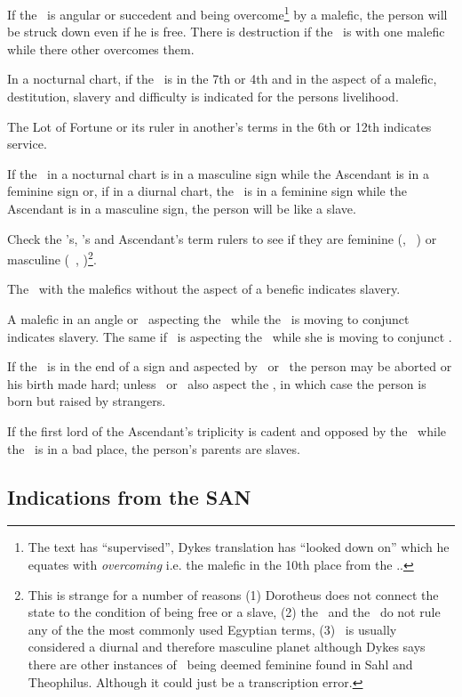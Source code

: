 If the \Moon\, is angular or succedent and being overcome\footnote{The text has ``supervised'', Dykes translation has ``looked down on'' which he equates with \textsl{overcoming} i.e. the malefic in the 10th place from the \Moon..} by a malefic, the person will be struck down even if he is free. There is destruction if the \Moon\, is with one malefic while there other overcomes them.

In a nocturnal chart, if the \Moon\, is in the 7th or 4th and in the aspect of a malefic, destitution, slavery and difficulty is indicated for the persons livelihood.

The Lot of Fortune or its ruler in another's terms in the 6th or 12th  indicates service.

If the \Moon\, in a nocturnal chart is in a masculine sign while the Ascendant is in a feminine sign or, if in a diurnal chart, the \Sun\, is in a feminine sign while the Ascendant is in a masculine sign, the person will be like a slave.

Check the \Moon's, \Sun's and Ascendant's term rulers to see if they are feminine (\Saturn, \Venus\, \Moon) or masculine (\Sun\, \Jupiter, \Mars)\footnote{This is strange for a number of reasons (1) Dorotheus does not connect the state to the condition of being free or a slave, (2) the \Moon\, and the \Sun\, do not rule any of the the most commonly used Egyptian terms, (3) \Saturn\, is usually considered a diurnal and therefore masculine planet although Dykes says there are other instances of \Saturn\, being deemed feminine found in Sahl and Theophilus. Although it could just be a transcription error.}.

The \Moon\, with the malefics without the aspect of a benefic indicates slavery.

A malefic in an angle or \Mars\, aspecting the \Moon\,  while the \Moon\, is moving to conjunct \Saturn\, indicates slavery. The same if \Saturn\, is aspecting the \Moon\, while she is moving to conjunct \Mars.

If the \Moon\, is in the end of a sign and aspected by \Saturn\, or \Mars\, the person may be aborted or his birth made hard; unless \Jupiter\, or \Venus\, also aspect the \Moon, in which case the person is born but raised by strangers.

If the first lord of the Ascendant's triplicity is cadent and opposed by the \Moon\, while the \Sun\, is in a bad place, the person's parents are slaves.

\subsection{Indications from the SAN}

